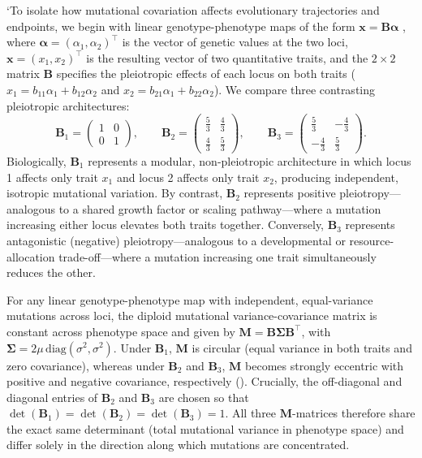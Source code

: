 `To isolate how mutational covariation affects evolutionary trajectories and endpoints, we begin with linear genotype-phenotype maps of the form $\boldsymbol{x} = \mathbf{B}\boldsymbol{\alpha}$ \parencite{wagner1989multivariate, wagner1984eigenvalue}, where $\boldsymbol{\alpha} = (\alpha_1, \alpha_2)^\top$ is the vector of genetic values at the two loci, $\boldsymbol{x} = (x_1, x_2)^\top$ is the resulting vector of two quantitative traits, and the $2 \times 2$ matrix $\mathbf{B}$ specifies the pleiotropic effects of each locus on both traits ($x_1 = b_{11}\alpha_1 + b_{12}\alpha_2$ and $x_2 = b_{21}\alpha_1 + b_{22}\alpha_2$).
We compare three contrasting pleiotropic architectures:
\begin{equation}
\mathbf{B}_1 = \begin{pmatrix} 1 & 0 \\ 0 & 1 \end{pmatrix}, \qquad
\mathbf{B}_2 = \begin{pmatrix} \frac{5}{3} & \frac{4}{3} \\ \frac{4}{3} & \frac{5}{3} \end{pmatrix}, \qquad
\mathbf{B}_3 = \begin{pmatrix} \frac{5}{3} & -\frac{4}{3} \\ -\frac{4}{3} & \frac{5}{3} \end{pmatrix}.
\end{equation}
Biologically, $\mathbf{B}_1$ represents a modular, non-pleiotropic architecture in which locus 1 affects only trait $x_1$ and locus 2 affects only trait $x_2$, producing independent, isotropic mutational variation.
By contrast, $\mathbf{B}_2$ represents positive pleiotropy—analogous to a shared growth factor or scaling pathway—where a mutation increasing either locus elevates both traits together.
Conversely, $\mathbf{B}_3$ represents antagonistic (negative) pleiotropy—analogous to a developmental or resource-allocation trade-off—where a mutation increasing one trait simultaneously reduces the other.

For any linear genotype-phenotype map with independent, equal-variance mutations across loci, the diploid mutational variance-covariance matrix is constant across phenotype space and given by $\mathbf{M} = \mathbf{B}\boldsymbol{\Sigma}\mathbf{B}^\top$, with $\boldsymbol{\Sigma} = 2\mu\,\mathrm{diag}(\sigma^2, \sigma^2)$.
Under $\mathbf{B}_1$, $\mathbf{M}$ is circular (equal variance in both traits and zero covariance), whereas under $\mathbf{B}_2$ and $\mathbf{B}_3$, $\mathbf{M}$ becomes strongly eccentric with positive and negative covariance, respectively ().
Crucially, the off-diagonal and diagonal entries of $\mathbf{B}_2$ and $\mathbf{B}_3$ are chosen so that $\det(\mathbf{B}_1) = \det(\mathbf{B}_2) = \det(\mathbf{B}_3) = 1$.
All three $\mathbf{M}$-matrices therefore share the exact same determinant (total mutational variance in phenotype space) and differ solely in the direction along which mutations are concentrated.

